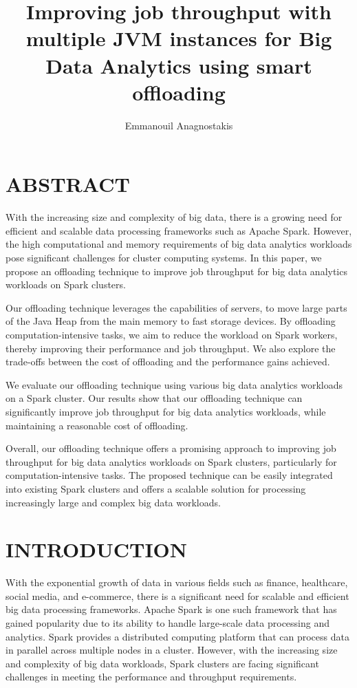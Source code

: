 \documentclass[twocolumn,10pt]{asme2e}
\title{Improving job throughput with multiple JVM instances for Big Data Analytics using smart offloading}
\author{Emmanouil Anagnostakis
    \affiliation{
	    Graduate Research Assistant\\
	    Computer Architecture and VLSI Systems Laboratory, ICS-FORTH\\
	    Heraklion, Greece\\
      manosanag@ics.forth.gr
    }	
}
\begin{document}
\maketitle    

\section*{ABSTRACT}

With the increasing size and complexity of big data, there is a growing need for efficient and scalable data processing frameworks such as Apache Spark. However, the high computational and memory requirements of big data analytics workloads pose significant challenges for cluster computing systems. In this paper, we propose an offloading technique to improve job throughput for big data analytics workloads on Spark clusters.

Our offloading technique leverages the capabilities of servers, to move large parts of the Java Heap from the main memory to fast storage devices. By offloading computation-intensive tasks, we aim to reduce the workload on Spark workers, thereby improving their performance and job throughput. We also explore the trade-offs between the cost of offloading and the performance gains achieved.

We evaluate our offloading technique using various big data analytics workloads on a Spark cluster. Our results show that our offloading technique can significantly improve job throughput for big data analytics workloads, while maintaining a reasonable cost of offloading.

\par Overall, our offloading technique offers a promising approach to improving job throughput for big data analytics workloads on Spark clusters, particularly for computation-intensive tasks. The proposed technique can be easily integrated into existing Spark clusters and offers a scalable solution for processing increasingly large and complex big data workloads.

\section*{INTRODUCTION}

With the exponential growth of data in various fields such as finance, healthcare, social media, and e-commerce, there is a significant need for scalable and efficient big data processing frameworks. Apache Spark is one such framework that has gained popularity due to its ability to handle large-scale data processing and analytics. Spark provides a distributed computing platform that can process data in parallel across multiple nodes in a cluster. However, with the increasing size and complexity of big data workloads, Spark clusters are facing significant challenges in meeting the performance and throughput requirements.
\end{document}
